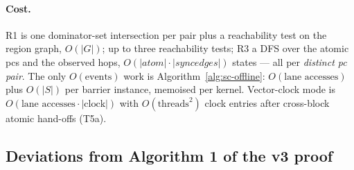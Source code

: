 \paragraph{Cost.}
R1 is one dominator-set intersection per pair plus a reachability test on the region
graph, $O(|G|)$; \LoopScope{} up to three reachability tests; R3 a DFS over the atomic pcs
and the observed hops, $O(|\mathit{atom}|\cdot|\mathit{syncedges}|)$ states --- all per
\emph{distinct pc pair}. The only $O(\text{events})$ work is
Algorithm~\ref{alg:sc-offline}: $O(\text{lane accesses})$ plus $O(|S|)$ per barrier
instance, memoised per kernel. Vector-clock mode is $O(\text{lane accesses}\cdot|\text{clock}|)$
with $O(\text{threads}^2)$ clock entries after cross-block atomic hand-offs (T5a).

\subsection*{Deviations from Algorithm 1 of the v3 proof}

